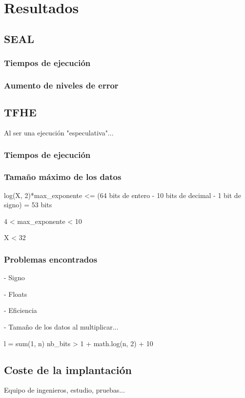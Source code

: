 \chapter{Resultados}
\label{chap:resultados}

\section{SEAL}

\subsection{Tiempos de ejecución}

\subsection{Aumento de niveles de error}

\section{TFHE}

Al ser una ejecución "especulativa"...

\subsection{Tiempos de ejecución}

\subsection{Tamaño máximo de los datos}

log(X, 2)*max_exponente <= (64 bits de entero - 10 bits de decimal - 1 bit de signo) = 53 bits

4 < max_exponente < 10

X < 32

\subsection{Problemas encontrados}

- Signo

- Floats

- Eficiencia


- Tamaño de los datos al multiplicar...

l = sum(1, n)
nb_bits > 1 + math.log(n, 2) + 10

\section{Coste de la implantación}

Equipo de ingenieros, estudio, pruebas...
